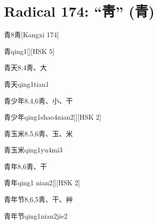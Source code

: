 
\section*{Radical 174: ``⾭'' (青)}

\begin{Entry}{青}{8}{⾭}[Kangxi 174]
  \begin{Phonetics}{青}{qing1}[][HSK 5]
  \end{Phonetics}
\end{Entry}

\begin{Entry}{青天}{8,4}{⾭、⼤}
  \begin{Phonetics}{青天}{qing1tian1}
  \end{Phonetics}
\end{Entry}

\begin{Entry}{青少年}{8,4,6}{⾭、⼩、⼲}
  \begin{Phonetics}{青少年}{qing1shao4nian2}[][HSK 2]
  \end{Phonetics}
\end{Entry}

\begin{Entry}{青玉米}{8,5,6}{⾭、⽟、⽶}
  \begin{Phonetics}{青玉米}{qing1yu4mi3}
  \end{Phonetics}
\end{Entry}

\begin{Entry}{青年}{8,6}{⾭、⼲}
  \begin{Phonetics}{青年}{qing1 nian2}[][HSK 2]
  \end{Phonetics}
\end{Entry}

\begin{Entry}{青年节}{8,6,5}{⾭、⼲、⾋}
  \begin{Phonetics}{青年节}{qing1nian2jie2}
  \end{Phonetics}
\end{Entry}

